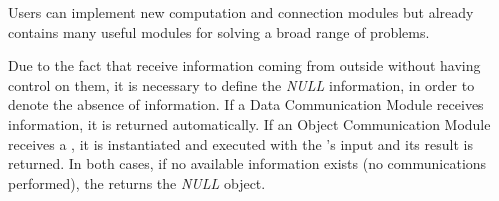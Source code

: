 Users can implement new computation and connection modules but \posl{} already contains many useful modules for solving a broad range of problems.

Due to the fact that \opchs{} receive information coming from outside without having control on them, it is necessary to define the {\it NULL} information, in order to denote the absence of information. If a Data Communication Module receives information, it is returned automatically. If an Object Communication Module receives a \om{}, it is instantiated and executed with the \opch's input and its result is returned. In both cases, if no available information exists (no communications performed), the \opch{} returns the {\it NULL} object.